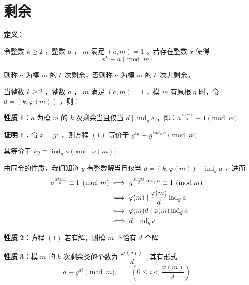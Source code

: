 \section{剩余}

\begin{tcolorbox}
\textbf{定义}：

令整数 $k\geq 2$ ，整数 $a$ ， $m$ 满足 $(a,m)=1$ ，若存在整数 $x$ 使得
\begin{equation}\tag{1}
x^k\equiv a\pmod m 
\end{equation}

则称 $a$ 为模 $m$ 的 $k$ 次剩余，否则称 $a$ 为模 $m$ 的 $k$ 次非剩余。
\end{tcolorbox}

当整数 $k\geq 2$ ，整数 $a$ ， $m$ 满足 $(a,m)=1$ ，模 $m$ 有原根 $g$ 时，令 $d=(k,\varphi(m))$ ，则：

\begin{tcolorbox}
\textbf{性质 1}：$a$ 为模 $m$ 的 $k$ 次剩余当且仅当 $d\mid \operatorname{ind}_g a$ ，即：$ a^{\frac{\varphi(m)}{d}}\equiv 1\pmod m $
\end{tcolorbox}

\begin{tcolorbox}
\textbf{证明 1}：令 $x=g^y$ ，则方程 $(1)$ 等价于
$ g^{ky}\equiv g^{\operatorname{ind}_g a}\pmod m $

其等价于
$ ky\equiv \operatorname{ind}_g a\pmod{\varphi(m)} $

由同余的性质，我们知道 $y$ 有整数解当且仅当 $d=(k,\varphi(m))\mid \operatorname{ind}_g a$ ，进而
\begin{align} 
\notag a^{\frac{\varphi(m)}{d}}\equiv 1\pmod m
&\notag \iff g^{\frac{\varphi(m)}{d}\operatorname{ind}_g a}\equiv 1\pmod m\\ 
&\notag \iff \varphi(m)\mid\frac{\varphi(m)}{d}\operatorname{ind}_g a\\ 
&\notag \iff \varphi(m)d\mid \varphi(m)\operatorname{ind}_g a\\ 
&\notag \iff d\mid \operatorname{ind}_g a
\end{align}

\end{tcolorbox}

\begin{tcolorbox}
\textbf{性质 2}：方程 $(1)$ 若有解，则模 $m$ 下恰有 $d$ 个解
\end{tcolorbox}

\begin{tcolorbox}
\textbf{性质 3}：模 $m$ 的 $k$ 次剩余类的个数为 $\dfrac{\varphi(m)}{d}$ , 其有形式
    $$ a\equiv g^{di}\pmod m,\qquad \left(0\leq i<\frac{\varphi(m)}{d}\right) $$
\end{tcolorbox}

